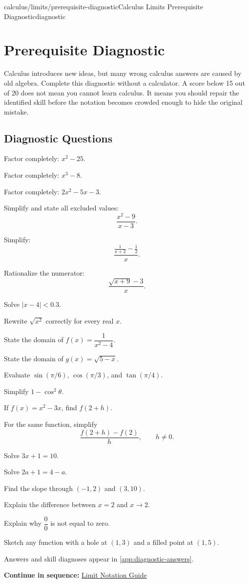 \documentclass[11pt,openany]{book}
\theoremstyle{bgplain}
\newcommand{\webnext}[2]{%
  \par\addvspace{1.2em}\noindent{\color{BGLine}\rule{\textwidth}{0.35pt}}\par\smallskip
  {\small\color{BGGray}\textbf{Continue in sequence:} \hyperlink{web:#1}{#2}}\par
}
\begin{document}
\begin{webpage}{calculus/limits/prerequisite-diagnostic}{Calculus Limits Prerequisite Diagnostic}{diagnostic}
\chapter*{Prerequisite Diagnostic}

Calculus introduces new ideas, but many wrong calculus answers are caused by old algebra. Complete this diagnostic without a calculator. A score below 15 out of 20 does not mean you cannot learn calculus. It means you should repair the identified skill before the notation becomes crowded enough to hide the original mistake.

\section*{Diagnostic Questions}

\begin{bgexercises}
  \item Factor completely: \(x^2-25\).
  \item Factor completely: \(x^3-8\).
  \item Factor completely: \(2x^2-5x-3\).
  \item Simplify and state all excluded values:
  \[
    \frac{x^2-9}{x-3}.
  \]
  \item Simplify:
  \[
    \frac{\frac{1}{x+2}-\frac12}{x}.
  \]
  \item Rationalize the numerator:
  \[
    \frac{\sqrt{x+9}-3}{x}.
  \]
  \item Solve \(|x-4|<0.3\).
  \item Rewrite \(\sqrt{x^2}\) correctly for every real \(x\).
  \item State the domain of \(f(x)=\dfrac{1}{x^2-4}\).
  \item State the domain of \(g(x)=\sqrt{5-x}\).
  \item Evaluate \(\sin(\pi/6)\), \(\cos(\pi/3)\), and \(\tan(\pi/4)\).
  \item Simplify \(1-\cos^2\theta\).
  \item If \(f(x)=x^2-3x\), find \(f(2+h)\).
  \item For the same function, simplify
  \[
    \frac{f(2+h)-f(2)}{h},\qquad h\ne0.
  \]
  \item Solve \(3x+1=10\).
  \item Solve \(2a+1=4-a\).
  \item Find the slope through \((-1,2)\) and \((3,10)\).
  \item Explain the difference between \(x=2\) and \(x\to2\).
  \item Explain why \(\dfrac00\) is not equal to zero.
  \item Sketch any function with a hole at \((1,3)\) and a filled point at \((1,5)\).
\end{bgexercises}

Answers and skill diagnoses appear in \cref{app:diagnostic-answers}.
\webnext{calculus/limits/notation-guide}{Limit Notation Guide}
\end{webpage}
\end{document}

